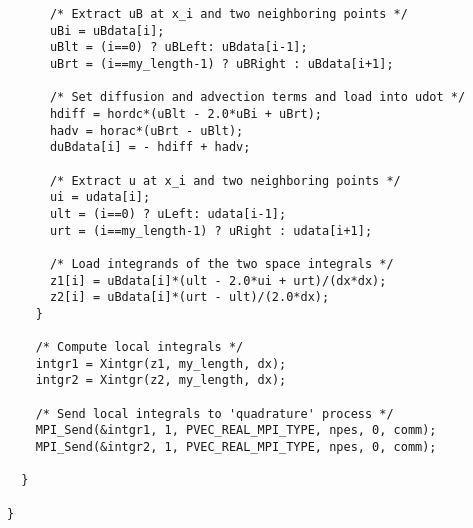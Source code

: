 \begin{verbatim}
      /* Extract uB at x_i and two neighboring points */
      uBi = uBdata[i];
      uBlt = (i==0) ? uBLeft: uBdata[i-1];
      uBrt = (i==my_length-1) ? uBRight : uBdata[i+1];
      
      /* Set diffusion and advection terms and load into udot */
      hdiff = hordc*(uBlt - 2.0*uBi + uBrt);
      hadv = horac*(uBrt - uBlt);
      duBdata[i] = - hdiff + hadv;

      /* Extract u at x_i and two neighboring points */
      ui = udata[i];
      ult = (i==0) ? uLeft: udata[i-1];
      urt = (i==my_length-1) ? uRight : udata[i+1];

      /* Load integrands of the two space integrals */
      z1[i] = uBdata[i]*(ult - 2.0*ui + urt)/(dx*dx);
      z2[i] = uBdata[i]*(urt - ult)/(2.0*dx);
    }

    /* Compute local integrals */
    intgr1 = Xintgr(z1, my_length, dx);
    intgr2 = Xintgr(z2, my_length, dx);

    /* Send local integrals to 'quadrature' process */
    MPI_Send(&intgr1, 1, PVEC_REAL_MPI_TYPE, npes, 0, comm);
    MPI_Send(&intgr2, 1, PVEC_REAL_MPI_TYPE, npes, 0, comm);

  }

}
\end{verbatim}